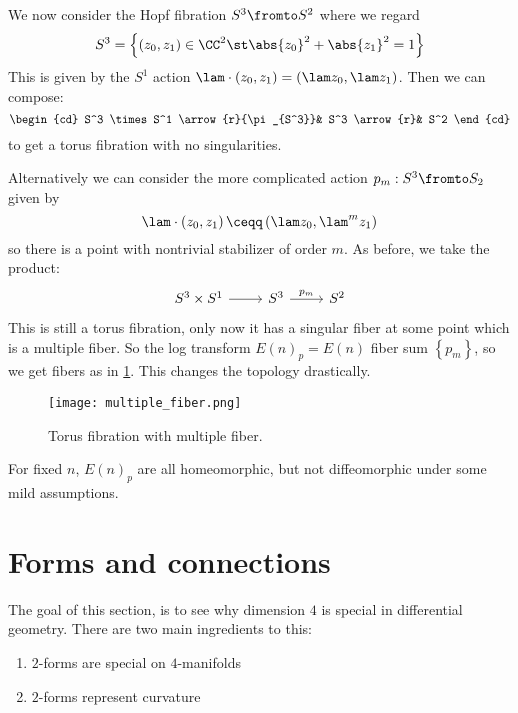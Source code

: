\documentclass{amsart}
\begin{document}
We now consider the Hopf fibration $S^3 \fromto S^2$
where we regard
\begin{equation}
S^3 = \left\{  \left( z_0 , z_1 \right) \in \CC^2 \st
\abs{z_0}^2 + \abs{z_1}^2 = 1\right\}
\end{equation}
This is given by the $S^1$ action $\lam \cdot \left( z_0 , z_1 \right) = 
\left( \lam z_0 , \lam z_1 \right)$. 
Then we can compose:
\begin{equation}
\begin{cd}
S^3 \times S^1 \arrow{r}{\pi_{S^3}}&
S^3 \arrow{r}&
S^2
\end{cd}
\end{equation}
to get a torus fibration with no singularities.

Alternatively we can consider the more complicated action $p_m:S^3 \fromto S_2$ given by
\begin{equation}
\lam \cdot \left( z_0 , z_1 \right) \ceqq
\left( \lam z_0 , \lam^m z_1 \right)
\end{equation}
so there is a point with nontrivial stabilizer of order $m$. 
As before, we take the product:
\begin{equation}
\begin{tikzcd}
S^3 \times S^1 \arrow{r}&
S^3 \arrow{r}{p_m}&
S^2
\end{tikzcd}
\end{equation}
This is still a torus fibration, only now it has a singular fiber at some point which is a multiple fiber.
So the log transform $E\left( n \right)_p = E\left( n \right)$ fiber sum $\left\{ p_m \right\}$, 
so we get fibers as in \cref{fig:torus_fibration_multiple_fiber}.
This changes the topology drastically.

\begin{figure}
\centering
\texttt{[image: multiple\_fiber.png]}
\caption{Torus fibration with multiple fiber.}
\label{fig:torus_fibration_multiple_fiber}
\end{figure}

\begin{thm}
For fixed $n$, $E\left( n \right)_p$
are all homeomorphic, but not diffeomorphic under some mild assumptions.
\end{thm}

\section{Forms and connections}

The goal of this section, is to see why dimension $4$ is
special in differential geometry.
There are two main ingredients to this:
\begin{enumerate}
\item $2$-forms are special on $4$-manifolds
\item $2$-forms represent curvature
\end{enumerate}
\end{document}
